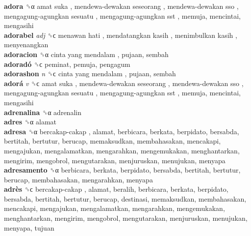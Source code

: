 \textbf{adora} ␝α   amat suka ,  mendewa-dewakan seseorang ,  mendewa-dewakan sso ,  mengagung-agungkan sesuatu ,  mengagung-agungkan sst , memuja, mencintai, mengasihi  \\
\textbf{adorabel} \emph{adj}  ␝ϲ   menawan hati ,  mendatangkan kasih ,  menimbulkan kasih , menyenangkan  \\
\textbf{adoracion} ␝α   cinta yang mendalam , pujaan, sembah  \\
\textbf{adoradó} ␝ϲ  peminat, pemuja, pengagum  \\
\textbf{adorashon} \emph{n}  ␝ϲ   cinta yang mendalam , pujaan, sembah  \\
\textbf{adorá} \emph{v}  ␝ϲ   amat suka ,  mendewa-dewakan seseorang ,  mendewa-dewakan sso ,  mengagung-agungkan sesuatu ,  mengagung-agungkan sst , memuja, mencintai, mengasihi  \\
\textbf{adrenalina} ␝α  adrenalin  \\
\textbf{adres} ␝α  alamat  \\
\textbf{adresa} ␝α   bercakap-cakap , alamat, berbicara, berkata, berpidato, bersabda, bertitah, bertutur, berucap, memaksudkan, membahasakan, mencakapi, mengajukan, mengalamatkan, mengarahkan, mengemukakan, menghantarkan, mengirim, mengobrol, mengutarakan, menjuruskan, menujukan, menyapa  \\
\textbf{adresamento} ␝α  berbicara, berkata, berpidato, bersabda, bertitah, bertutur, berucap, membahasakan, mengarahkan, menyapa  \\
\textbf{adrès} ␝ϲ   bercakap-cakap , alamat, beralih, berbicara, berkata, berpidato, bersabda, bertitah, bertutur, berucap, destinasi, memaksudkan, membahasakan, mencakapi, mengajukan, mengalamatkan, mengarahkan, mengemukakan, menghantarkan, mengirim, mengobrol, mengutarakan, menjuruskan, menujukan, menyapa, tujuan  \\
